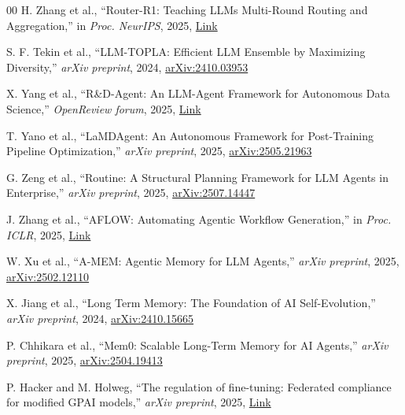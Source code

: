 \documentclass[final,5p,times,twocolumn,authoryear,draft]{elsarticle}
\begin{document}
\begin{thebibliography}{00}
 H. Zhang et al., ``Router-R1: Teaching LLMs Multi-Round Routing and Aggregation,'' 
in \textit{Proc. NeurIPS}, 2025, 
\href{https://openreview.net/forum?id=DWf4vroKWJ}{Link}

 S. F. Tekin et al., ``LLM-TOPLA: Efficient LLM Ensemble by Maximizing Diversity,'' 
\textit{arXiv preprint}, 2024, 
\href{https://arxiv.org/abs/2410.03953}{arXiv:2410.03953}

 X. Yang et al., ``R\&D-Agent: An LLM-Agent Framework for Autonomous Data Science,'' 
\textit{OpenReview forum}, 2025, 
\href{https://openreview.net/forum?id=APjCXYORXO}{Link}

 T. Yano et al., ``LaMDAgent: An Autonomous Framework for Post-Training Pipeline Optimization,'' 
\textit{arXiv preprint}, 2025, 
\href{https://arxiv.org/abs/2505.21963}{arXiv:2505.21963}

 G. Zeng et al., ``Routine: A Structural Planning Framework for LLM Agents in Enterprise,'' 
\textit{arXiv preprint}, 2025, 
\href{https://arxiv.org/abs/2507.14447}{arXiv:2507.14447}

 J. Zhang et al., ``AFLOW: Automating Agentic Workflow Generation,'' 
in \textit{Proc. ICLR}, 2025, 
\href{https://arxiv.org/abs/2410.10762}{Link}

 W. Xu et al., ``A-MEM: Agentic Memory for LLM Agents,'' 
\textit{arXiv preprint}, 2025, 
\href{https://arxiv.org/abs/2502.12110}{arXiv:2502.12110}

 X. Jiang et al., ``Long Term Memory: The Foundation of AI Self-Evolution,'' 
\textit{arXiv preprint}, 2024, 
\href{https://arxiv.org/abs/2410.15665}{arXiv:2410.15665}

 P. Chhikara et al., ``Mem0: Scalable Long-Term Memory for AI Agents,'' 
\textit{arXiv preprint}, 2025, 
\href{https://arxiv.org/abs/2504.19413}{arXiv:2504.19413}

 P. Hacker and M. Holweg, ``The regulation of fine-tuning: Federated compliance for modified GPAI models,'' 
\textit{arXiv preprint}, 2025, 
\href{https://www.sciencedirect.com/science/article/pii/S2212473X25001063}{Link}

\end{thebibliography}
\end{document}
